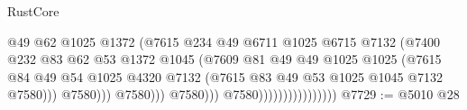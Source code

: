 \begin{lexlean}{RustCore}
\begin{coremodule}
                                                  @49
                                                  @62
                                                  @1025
                                                  @1372
                                                  (@7615
                                                    @234
                                                    @49
                                                    @6711
                                                    @1025
                                                    @6715
                                                    @7132
                                                    (@7400
                                                      @232
                                                      @83
                                                      @62
                                                      @53
                                                      @1372
                                                      @1045
                                                      (@7609
                                                        @81
                                                        @49
                                                        @49
                                                        @1025
                                                        @1025
                                                        (@7615
                                                          @84
                                                          @49
                                                          @54
                                                          @1025
                                                          @4320
                                                          @7132
                                                          (@7615
                                                            @83
                                                            @49
                                                            @53
                                                            @1025
                                                            @1045
                                                            @7132
                                                            @7580)))
                                                      @7580)))
                                                @7580)))
                                          @7580)))
                                    @7580))))))))))))))))
@7729 := @5010 @28

\end{coremodule}
\end{lexlean}
